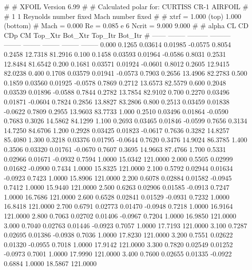 #  
#       XFOIL         Version 6.99
#  
# Calculated polar for: CURTISS CR-1 AIRFOIL                            
#  
# 1 1 Reynolds number fixed          Mach number fixed         
#  
# xtrf =   1.000 (top)        1.000 (bottom)  
# Mach =   0.000     Re =     0.085 e 6     Ncrit =   9.000  9.000
#  
#   alpha    CL        CD       CDp       CM     Top_Xtr  Bot_Xtr  Top_Itr  Bot_Itr
#  ------ -------- --------- --------- -------- -------- -------- -------- --------
   0.000   0.1265   0.03614   0.01985  -0.0575   0.8054   0.2458  12.7318  81.2916
   0.100   0.1458   0.03593   0.01964  -0.0586   0.8031   0.2531  12.8484  81.6542
   0.200   0.1681   0.03571   0.01924  -0.0601   0.8012   0.2605  12.9415  82.0238
   0.400   0.1708   0.03579   0.01941  -0.0573   0.7903   0.2656  13.4906  82.2783
   0.500   0.1859   0.03560   0.01925  -0.0578   0.7869   0.2712  13.6573  82.5579
   0.600   0.2048   0.03539   0.01896  -0.0588   0.7844   0.2782  13.7854  82.9102
   0.700   0.2270   0.03496   0.01871  -0.0604   0.7824   0.2856  13.8827  83.2806
   0.800   0.2513   0.03459   0.01838  -0.0622   0.7809   0.2955  13.9603  83.7733
   1.000   0.2510   0.03496   0.01864  -0.0590   0.7683   0.3026  14.5862  84.1299
   1.100   0.2693   0.03465   0.01846  -0.0599   0.7656   0.3134  14.7250  84.6706
   1.200   0.2928   0.03425   0.01823  -0.0617   0.7636   0.3282  14.8257  85.4080
   1.300   0.3218   0.03376   0.01795  -0.0644   0.7620   0.3476  14.9024  86.3785
   1.400   0.3506   0.03320   0.01761  -0.0670   0.7607   0.3695  14.9663  87.4766
   1.700   0.5331   0.02966   0.01671  -0.0932   0.7594   1.0000  15.0342 121.0000
   2.000   0.5505   0.02999   0.01682  -0.0900   0.7434   1.0000  15.8325 121.0000
   2.100   0.5792   0.02944   0.01634  -0.0923   0.7423   1.0000  15.8906 121.0000
   2.200   0.6078   0.02884   0.01582  -0.0945   0.7412   1.0000  15.9440 121.0000
   2.500   0.6263   0.02906   0.01585  -0.0913   0.7247   1.0000  16.7686 121.0000
   2.600   0.6528   0.02841   0.01529  -0.0931   0.7232   1.0000  16.8418 121.0000
   2.700   0.6791   0.02773   0.01470  -0.0948   0.7218   1.0000  16.9164 121.0000
   2.800   0.7063   0.02702   0.01406  -0.0967   0.7204   1.0000  16.9850 121.0000
   3.000   0.7040   0.02763   0.01446  -0.0923   0.7057   1.0000  17.7193 121.0000
   3.100   0.7287   0.02695   0.01386  -0.0938   0.7036   1.0000  17.8230 121.0000
   3.200   0.7551   0.02622   0.01320  -0.0955   0.7018   1.0000  17.9142 121.0000
   3.300   0.7820   0.02549   0.01252  -0.0973   0.7001   1.0000  17.9990 121.0000
   3.400   0.7600   0.02655   0.01335  -0.0922   0.6884   1.0000  18.5867 121.0000
